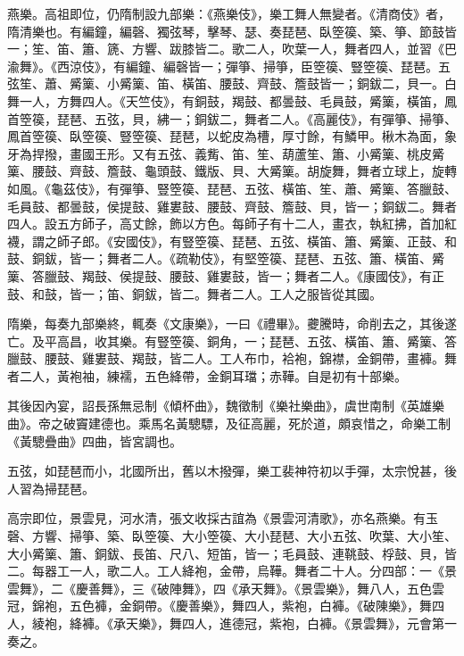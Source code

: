 \begin{pinyinscope}
 燕樂。高祖即位，仍隋制設九部樂：《燕樂伎》，樂工舞人無變者。《清商伎》者，隋清樂也。有編鐘，編磬、獨弦琴，擊琴、瑟、奏琵琶、臥箜篌、築、箏、節鼓皆一；笙、笛、簫、篪、方響、跋膝皆二。歌二人，吹葉一人，舞者四人，並習《巴渝舞》。《西涼伎》，有編鐘、編磬皆一；彈箏、掃箏，臣箜篌、豎箜篌、琵琶。五弦笙、蕭、觱篥、小觱篥、笛、橫笛、腰鼓、齊鼓、簷鼓皆一；銅鈸二，貝一。白舞一人，方舞四人。《天竺伎》，有銅鼓，羯鼓、都曇鼓、毛員鼓，觱篥，橫笛，鳳首箜篌，琵琶、五弦，貝，紼一；銅鈸二，舞者二人。《高麗伎》，有彈箏、掃箏、鳳首箜篌、臥箜篌、豎箜篌、琵琶，以蛇皮為槽，厚寸餘，有鱗甲。楸木為面，象牙為捍撥，畫國王形。又有五弦、義觜、笛、笙、葫蘆笙、簫、小觱篥、桃皮觱篥、腰鼓、齊鼓、簷鼓、龜頭鼓、鐵版、貝、大觱篥。胡旋舞，舞者立球上，旋轉如風。《龜茲伎》，有彈箏、豎箜篌、琵琶、五弦、橫笛、笙、蕭、觱篥、答臘鼓、毛員鼓、都曇鼓，侯提鼓、雞婁鼓、腰鼓、齊鼓、簷鼓、貝，皆一；銅鈸二。舞者四人。設五方師子，高丈餘，飾以方色。每師子有十二人，畫衣，執紅拂，首加紅襪，謂之師子郎。《安國伎》，有豎箜篌、琵琶、五弦、橫笛、簫、觱篥、正鼓、和鼓、銅鈸，皆一；舞者二人。《疏勒伎》，有堅箜篌、琵琶、五弦、簫、橫笛、觱篥、答臘鼓、羯鼓、侯提鼓、腰鼓、雞婁鼓，皆一；舞者二人。《康國伎》，有正鼓、和鼓，皆一；笛、銅鈸，皆二。舞者二人。工人之服皆從其國。



 隋樂，每奏九部樂終，輒奏《文康樂》，一曰《禮畢》。虁騰時，命削去之，其後遂亡。及平高昌，收其樂。有豎箜篌、銅角，一；琵琶、五弦、橫笛、簫、觱篥、答臘鼓、腰鼓、雞婁鼓、羯鼓，皆二人。工人布巾，袷袍，錦襟，金銅帶，畫褲。舞者二人，黃袍袖，練襦，五色絳帶，金銅耳璫；赤鞾。自是初有十部樂。



 其後因內宴，詔長孫無忌制《傾杯曲》，魏徵制《樂社樂曲》，虞世南制《英雄樂曲》。帝之破竇建德也。乘馬名黃驄驃，及征高麗，死於道，頗哀惜之，命樂工制《黃驄疊曲》四曲，皆宮調也。



 五弦，如琵琶而小，北國所出，舊以木撥彈，樂工裴神符初以手彈，太宗悅甚，後人習為掃琵琶。



 高宗即位，景雲見，河水清，張文收採古誼為《景雲河清歌》，亦名燕樂。有玉磬、方響、掃箏、築、臥箜篌、大小箜篌、大小琵琶、大小五弦、吹葉、大小笙、大小觱篥、簫、銅鈸、長笛、尺八、短笛，皆一；毛員鼓、連鞉鼓、桴鼓、貝，皆二。每器工一人，歌二人。工人絳袍，金帶，烏鞾。舞者二十人。分四部：一《景雲舞》，二《慶善舞》，三《破陣舞》，四《承天舞》。《景雲樂》，舞八人，五色雲冠，錦袍，五色褲，金銅帶。《慶善樂》，舞四人，紫袍，白褲。《破陳樂》，舞四人，綾袍，絳褲。《承天樂》，舞四人，進德冠，紫袍，白褲。《景雲舞》，元會第一奏之。




\end{pinyinscope}
